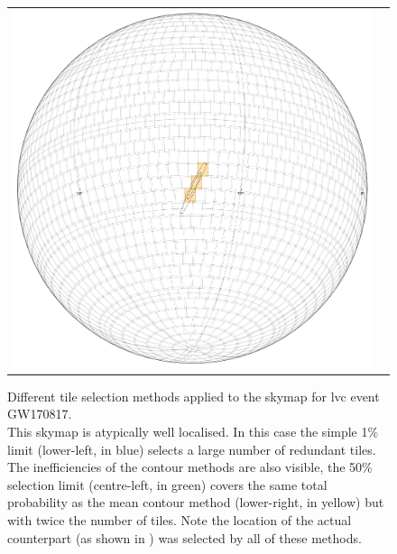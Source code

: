 \begin{colsection}
\begin{colsection}
\begin{figure}[p]
\begin{center}
\begin{tabular}{cc}
\includegraphics[width=0.25\linewidth]{images/tiling/2_b.png}
\\

\end{tabular}
\end{center}
\caption[Different tile selection methods for GW170817]{Different tile selection methods applied to the skymap for \gls{lvc} event GW170817.\\
This skymap is atypically well localised. In this case the simple 1\% limit (lower-left, in blue) selects a large number of redundant tiles. The inefficiencies of the contour methods are also visible, the 50\% selection limit (centre-left, in green) covers the same total probability as the mean contour method (lower-right, in yellow) but with twice the number of tiles. Note the location of the actual counterpart (as shown in ) was selected by all of these methods.
}
\label{fig:tiling_GW170817}
\end{figure}



\end{colsection}
\end{colsection}
